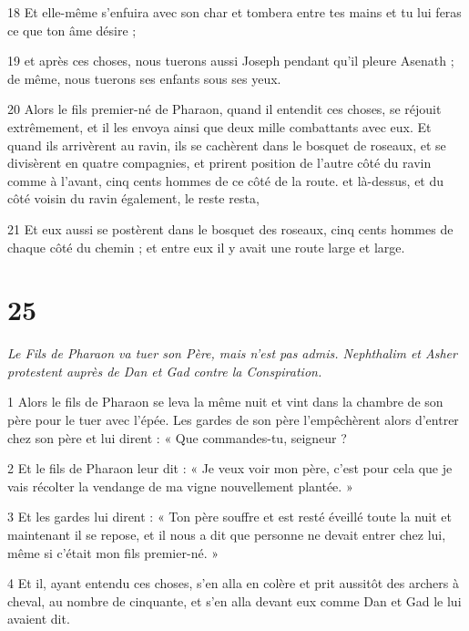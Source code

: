 \par 18 Et elle-même s'enfuira avec son char et tombera entre tes mains et tu lui feras ce que ton âme désire ;

\par 19 et après ces choses, nous tuerons aussi Joseph pendant qu'il pleure Asenath ; de même, nous tuerons ses enfants sous ses yeux.

\par 20 Alors le fils premier-né de Pharaon, quand il entendit ces choses, se réjouit extrêmement, et il les envoya ainsi que deux mille combattants avec eux. Et quand ils arrivèrent au ravin, ils se cachèrent dans le bosquet de roseaux, et se divisèrent en quatre compagnies, et prirent position de l'autre côté du ravin comme à l'avant, cinq cents hommes de ce côté de la route. et là-dessus, et du côté voisin du ravin également, le reste resta,

\par 21 Et eux aussi se postèrent dans le bosquet des roseaux, cinq cents hommes de chaque côté du chemin ; et entre eux il y avait une route large et large.


\chapter{25}

\par \textit{Le Fils de Pharaon va tuer son Père, mais n'est pas admis. Nephthalim et Asher protestent auprès de Dan et Gad contre la Conspiration.}


\par 1 Alors le fils de Pharaon se leva la même nuit et vint dans la chambre de son père pour le tuer avec l'épée. Les gardes de son père l'empêchèrent alors d'entrer chez son père et lui dirent : « Que commandes-tu, seigneur ?

\par 2 Et le fils de Pharaon leur dit : « Je veux voir mon père, c'est pour cela que je vais récolter la vendange de ma vigne nouvellement plantée. »

\par 3 Et les gardes lui dirent : « Ton père souffre et est resté éveillé toute la nuit et maintenant il se repose, et il nous a dit que personne ne devait entrer chez lui, même si c'était mon fils premier-né. »

\par 4 Et il, ayant entendu ces choses, s'en alla en colère et prit aussitôt des archers à cheval, au nombre de cinquante, et s'en alla devant eux comme Dan et Gad le lui avaient dit.

